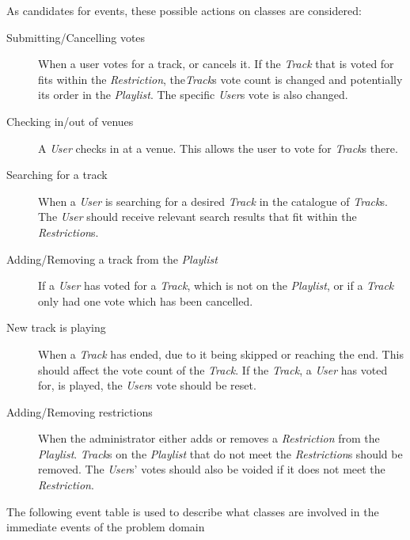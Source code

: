 As candidates for events, these possible actions on classes are considered:
\begin{description}
\item[Submitting/Cancelling votes]
    When a user votes for a track, or cancels it. If the \textit{Track} that is voted for fits within the \textit{Restriction}, the\textit{Track}s vote count is changed and potentially its order in the \textit{Playlist}. The specific \textit{User}s vote is also changed.
\item[Checking in/out of venues]
    A \textit{User} checks in at a venue. This allows the user to vote for \textit{Track}s there.
\item[Searching for a track]
    When a \textit{User} is searching for a desired \textit{Track} in the catalogue of \textit{Track}s. The \textit{User} should receive relevant search results that fit within the \textit{Restriction}s.
\item[Adding/Removing a track from the \textit{Playlist}]
    If a \textit{User} has voted for a \textit{Track}, which is not on the \textit{Playlist}, or if a \textit{Track} only had one vote which has been cancelled.
\item[New track is playing]
    When a \textit{Track} has ended, due to it being skipped or reaching the end. This should affect the vote count of the \textit{Track}. If the \textit{Track}, a \textit{User} has voted for, is played, the \textit{User}s vote should be reset.
\item[Adding/Removing restrictions]
    When the administrator either adds or removes a \textit{Restriction} from the \textit{Playlist}. \textit{Track}s on the \textit{Playlist} that do not meet the \textit{Restriction}s should be removed. The \textit{User}s' votes should also be voided if it does not meet the \textit{Restriction}.
\end{description}


The following event table is used to describe what classes are involved in the immediate events of the problem domain

